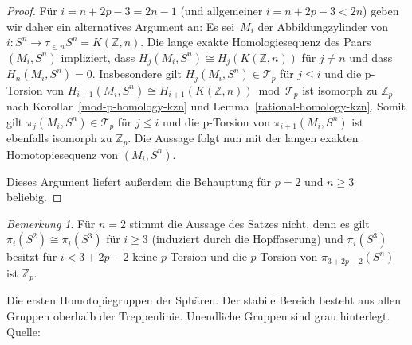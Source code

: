 \documentclass[11pt, a4paper, german]{article}
\theoremstyle{definition}
\theoremstyle{remark}
\newtheorem*{bem}{Bemerkung}
\newcommand{\Z}{\mathbb{Z}} %
\newcommand{\T}{\mathcal{T}} %
\begin{document}
\begin{proof}
  Für $i = n + 2p - 3 = 2n - 1$ (und allgemeiner $i = n + 2p - 3 < 2n$) geben wir daher ein alternatives Argument an:
  Es sei~$M_i$ der Abbildungzylinder von $i : S^n \to \tau_{\leq n} S^n = K(\Z, n)$.
  Die lange exakte Homologiesequenz des Paars $(M_i, S^n)$ impliziert, dass $H_j(M_i, S^n) \cong H_j(K(\Z, n))$ für $j \neq n$ und dass $H_n(M_i, S^n) = 0$.
  Insbesondere gilt $H_j(M_i, S^n) \in \T_p$ für $j \leq i$ und die p-Torsion von $H_{i+1}(M_i, S^n) \cong H_{i+1}(K(\Z, n)) \bmod{\T_p}$ ist isomorph zu $\Z_p$  nach Korollar~\ref{mod-p-homology-kzn} und Lemma~\ref{rational-homology-kzn}.
  Somit gilt $\pi_j(M_i, S^n) \in \T_p$ für $j \leq i$ und die p-Torsion von $\pi_{i+1}(M_i, S^n)$ ist ebenfalls isomorph zu $\Z_p$.
  Die Aussage folgt nun mit der langen exakten Homotopiesequenz von $(M_i, S^n)$.
  
  Dieses Argument liefert außerdem die Behauptung für $p=2$ und $n \geq 3$ beliebig.
\end{proof}

\begin{bem}
  Für $n=2$ stimmt die Aussage des Satzes nicht, denn
  es gilt $\pi_i(S^2) \cong \pi_i(S^3)$ für $i \geq 3$ (induziert durch die Hopffaserung) und $\pi_i(S^3)$ besitzt für $i < 3 + 2p - 2$ keine $p$-Torsion und die $p$-Torsion von $\pi_{3 + 2p - 2}(S^n)$ ist $\Z_p$.
\end{bem}

\nocite{*}
\printbibliography

\newpage
{}
\begin{landscape}
  \vspace*{\fill}
  \begin{center}
    \begin{table}[htb!]
      \footnotesize \setlength\extrarowheight{5pt}
      
      \caption{Die ersten Homotopiegruppen der Sphären. Der stabile Bereich besteht aus allen Gruppen oberhalb der Treppenlinie. Unendliche Gruppen sind grau hinterlegt. Quelle: \cite{toda:composition}}
    \end{table}
  \end{center}
  \vspace*{\fill}
\end{landscape}

\end{document}
